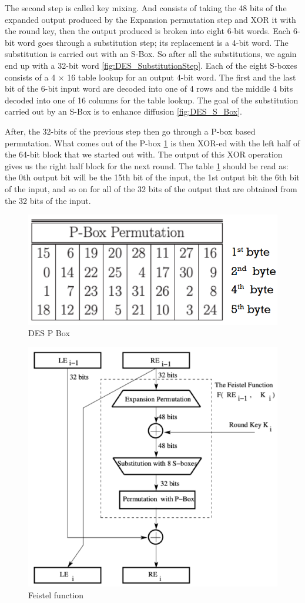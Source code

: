 The second step is called key mixing. And consists of taking the 48 bits of the expanded output produced by the Expansion permutation step and XOR it with the round key, then the output produced is broken into eight 6-bit words. Each 6-bit word goes through a substitution step; its replacement is a 4-bit word. The substitution is carried out with an S-Box. So after all the substitutions, we again end up with a 32-bit word \ref{fig:DES_SubstitutionStep}. Each of the eight S-boxes consists of a 4 × 16 table lookup for an output 4-bit word. The first and the last bit of the 6-bit input word are decoded into one of 4 rows and the middle 4 bits decoded into one of 16 columns for the table lookup. The goal of the substitution carried out by an S-Box is to enhance diffusion \ref{fig:DES_S_Box}.

After, the 32-bits of the previous step then go through a P-box based permutation. What comes out of the P-box \ref{fig:DES_P_Box} is then XOR-ed with the left half of the 64-bit block that we started out with. The output of this XOR operation gives us the right half block for the next round. The table \ref{fig:DES_P_Box} should be read as: the 0th output bit will be the 15th bit of the input, the 1st output bit the 6th bit of the input, and so on for all of the 32 bits of the output that are obtained from the 32 bits of the input.

\begin{figure}
	\centering
	\includegraphics[width=0.3\linewidth]{Images/Chapter3/DES_P_Box}
	\caption{DES P Box}
	\label{fig:DES_P_Box}
\end{figure}

\begin{figure}
	\centering
	\includegraphics[width=0.7\linewidth]{Images/Chapter3/DES_FeistelFunction}
	\caption{Feistel function}
	\label{fig:DES_FeistelFunction}
\end{figure}

